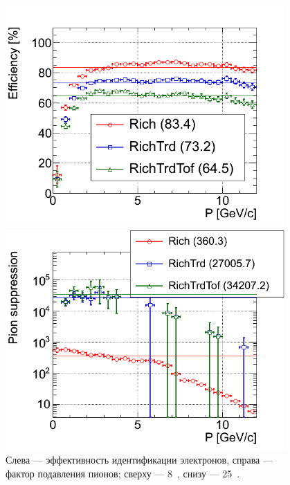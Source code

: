 \begin{figure}[H]
\begin{minipage}[t]{0.495\textwidth}
\includegraphics[width=0.95\textwidth]{pictures/RICHeff3.png}
\end{minipage}
\begin{minipage}[t]{0.495\textwidth}
\includegraphics[width=0.95\textwidth]{pictures/RICHeff4.png}
\end{minipage}
\caption{Слева --- эффективность идентификации электронов, справа --- фактор подавления пионов; сверху --- 8~\GeVperNucl{}, снизу --- 25~\GeVperNucl{}.}
\label{fig:RICHeff}
\end{figure}


